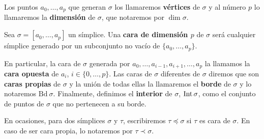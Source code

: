 Los puntos $a_{0}, \ldots, a_{p}$ que generan $\sigma$ los llamaremos \textbf{vértices}
de $\sigma$ y al número $p$ lo llamaremos la \textbf{dimensión} de $\sigma$, que
notaremos por $\dim \sigma$.

\begin{definicion}
	Sea $\sigma=[a_{0}, \ldots, a_{p}]$ un símplice. Una \textbf{cara de dimensión
		$p$} de $\sigma$ será cualquier símplice generado por un subconjunto no vacío de
	$\{a_{0}, \ldots, a_{p}\}$.
\end{definicion}
En particular, la cara de $\sigma$ generada por
$a_{0}, \ldots, a_{i-1}, a_{i+1}, \ldots, a_{p}$ la llamamos la \textbf{cara
	opuesta} de $a_{i}$, $i \in \{0, \ldots, p\}$. Las caras de $\sigma$ diferentes de
$\sigma$ diremos que son \textbf{caras propias} de $\sigma$ y la unión de todas
ellas la llamaremos el \textbf{borde} de $\sigma$ y lo notaremos $\text{Bd}\ \sigma$.
Finalmente, definimos el \textbf{interior} de $\sigma$, $\operatorname{Int} \sigma$, como
el conjunto de puntos de $\sigma$ que no pertenecen a su borde.

En ocasiones, para dos símplices $\sigma$ y $\tau$, escribiremos
$\tau \preceq \sigma$ si $\tau$ es cara de $\sigma$. En caso de ser cara propia,
lo notaremos por $\tau \prec \sigma$.

